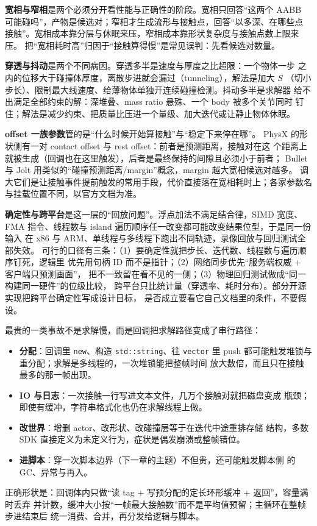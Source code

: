 \documentclass[12pt,a4paper,fontset=fandol]{ctexbook}
\newcommand{\Tp}[1]{\texttt{#1}}
\begin{document}
\textbf{宽相与窄相}是两个必须分开看性能与正确性的阶段。宽相只回答``这两个
AABB 可能碰吗''，产物是候选对；窄相才生成流形与接触点，回答``以多深、在哪些点
接触''。宽相成本靠分层与休眠来压，窄相成本靠形状复杂度与接触点数上限来压。
把``宽相耗时高''归因于``接触算得慢''是常见误判：先看候选对数量。

\textbf{穿透与抖动}是两个不同病因。穿透多半是速度与厚度之比超限：一个物体一步
之内的位移大于碰撞体厚度，离散步进就会漏过（tunneling），解法是加大 $S$
（切小步长）、限制最大线速度、给薄物体单独开连续碰撞检测。抖动多半是求解器
给不出满足全部约束的解：深堆叠、mass ratio 悬殊、一个 body 被多个关节同时
钉住；解法是减少约束、把质量比压进一个量级、加大迭代或让静止物体休眠。

\textbf{offset 一族参数}管的是``什么时候开始算接触''与``稳定下来停在哪''。
PhysX 的形状侧有一对 contact offset 与 rest offset：前者是预测距离，接触对在这
个距离上就被生成（回调也在这里触发），后者是最终保持的间隙且必须小于前者；
Bullet 与 Jolt 用类似的``碰撞预测距离/margin''概念，margin 越大宽相候选对越多。
调大它们是让接触事件提前触发的常用手段，代价直接落在宽相耗时上；各家参数名
与挂载位置不同，以官方文档为准。

\textbf{确定性与跨平台}是这一层的``回放问题''。浮点加法不满足结合律，SIMD 宽度、
FMA 指令、线程数与 island 遍历顺序任一改变都可能改变结果位型，于是同一份输入
在 x86 与 ARM、单线程与多线程下跑出不同轨迹，录像回放与回归测试全部失效。
可行的口径有三条：（1）要确定性就把步长、迭代数、线程数与遍历顺序钉死，逻辑里
优先用句柄 ID 而不是指针；（2）网络同步优先``服务端权威 + 客户端只预测画面''，
把不一致留在看不见的一侧；（3）物理回归测试做成``同一构建同一硬件''的位级比较，
跨平台只比统计量（穿透率、耗时分布）。部分开源实现把跨平台确定性写成设计目标，
是否成立要看它自己文档里的条件，不要假设。

\begin{warning}[title={在物理回调里做内存分配或 IO}]
最贵的一类事故不是求解慢，而是回调把求解路径变成了串行路径：
\begin{itemize}
  \item \textbf{分配}：回调里 \Tp{new}、构造 \Tp{std::string}、往 \Tp{vector}
        里 push 都可能触发堆锁与重分配；求解是多线程的，一次堆锁能把整帧时间
        放大数倍，而且只在接触最多的那一帧出现。
  \item \textbf{IO 与日志}：一次接触一行写进文本文件，几万个接触对就把磁盘变成
        瓶颈；即使有缓冲，字符串格式化也仍在求解线程上做。
  \item \textbf{改世界}：增删 actor、改形状、改碰撞层等于在迭代中途重排存储
        结构，多数 SDK 直接定义为未定义行为，症状是偶发崩溃或整帧错位。
  \item \textbf{进脚本}：穿一次脚本边界（下一章的主题）不但贵，还可能触发脚本侧
        的 GC、异常与再入。
\end{itemize}
正确形状是：回调体内只做``读 tag + 写预分配的定长环形缓冲 + 返回''，容量满时丢弃
并计数，缓冲大小按``一帧最大接触数''而不是平均值预留；主循环在整帧步进结束后
统一消费、合并，再分发给逻辑与脚本。
\end{warning}
\end{document}
